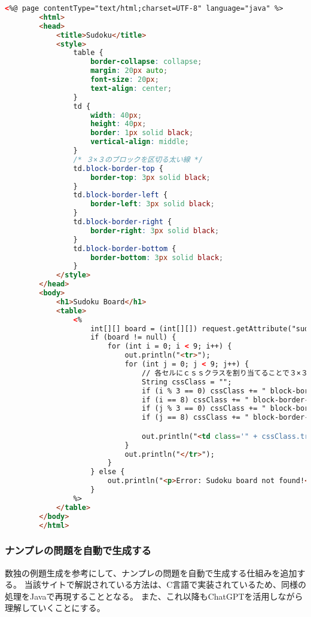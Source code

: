 \documentclass[a4paper,10pt]{jsarticle}
\begin{document}
      \begin{lstlisting}[caption=ナンプレの盤面を再現,label=fix_banmen,language=HTML]
        <%@ page contentType="text/html;charset=UTF-8" language="java" %>
        <html>
        <head>
            <title>Sudoku</title>
            <style>
                table {
                    border-collapse: collapse;
                    margin: 20px auto;
                    font-size: 20px;
                    text-align: center;
                }
                td {
                    width: 40px;
                    height: 40px;
                    border: 1px solid black;
                    vertical-align: middle;
                }
                /* ３×３のブロックを区切る太い線 */
                td.block-border-top {
                    border-top: 3px solid black;
                }
                td.block-border-left {
                    border-left: 3px solid black;
                }
                td.block-border-right {
                    border-right: 3px solid black;
                }
                td.block-border-bottom {
                    border-bottom: 3px solid black;
                }
            </style>
        </head>
        <body>
            <h1>Sudoku Board</h1>
            <table>
                <%
                    int[][] board = (int[][]) request.getAttribute("sudokuBoard");
                    if (board != null) {
                        for (int i = 0; i < 9; i++) {
                            out.println("<tr>");
                            for (int j = 0; j < 9; j++) {
                                // 各セルにｃｓｓクラスを割り当てることで３×３の区切り線を作成
                                String cssClass = "";
                                if (i % 3 == 0) cssClass += " block-border-top";
                                if (i == 8) cssClass += " block-border-bottom";
                                if (j % 3 == 0) cssClass += " block-border-left";
                                if (j == 8) cssClass += " block-border-right";

                                out.println("<td class='" + cssClass.trim() + "'>" + (board[i][j] == 0 ? "" : board[i][j]) + "</td>");
                            }
                            out.println("</tr>");
                        }
                    } else {
                        out.println("<p>Error: Sudoku board not found!</p>");
                    }
                %>
            </table>
        </body>
        </html>
      \end{lstlisting}
    \subsubsection{ナンプレの問題を自動で生成する}
      数独の例題生成\cite{sudoku_reidai}を参考にして、ナンプレの問題を自動で生成する仕組みを追加する。
      当該サイトで解説されている方法は、C言語で実装されているため、同様の処理をJavaで再現することとなる。
      また、これ以降もChatGPTを活用しながら理解していくことにする。
\end{document}
